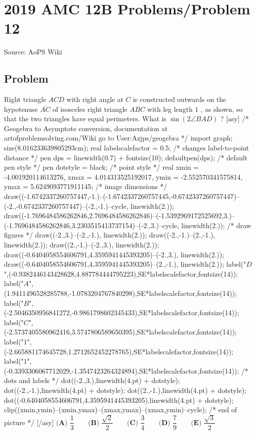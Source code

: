 \documentclass[12pt]{article}
\begin{document}
\section*{{2019 AMC 12B Problems/Problem 12}}
Source: AoPS Wiki

\subsection*{Problem}
Right triangle $ACD$ with right angle at $C$ is constructed outwards on the hypotenuse $\overline{AC}$ of isosceles right triangle $ABC$ with leg length $1$ , as shown, so that the two triangles have equal perimeters. What is $\sin(2\angle BAD)$ ? [asy] /* Geogebra to Asymptote conversion, documentation at artofproblemsolving.com/Wiki go to User:Azjps/geogebra */ import graph; size(8.016233639805293cm); real labelscalefactor = 0.5; /* changes label-to-point distance */ pen dps = linewidth(0.7) + fontsize(10); defaultpen(dps); /* default pen style */ pen dotstyle = black; /* point style */ real xmin = -4.001920114613276, xmax = 4.014313525192017, ymin = -2.552570341575814, ymax = 5.6249093771911145; /* image dimensions */ draw((-1.6742337260757447,-1.)--(-1.6742337260757445,-0.6742337260757447)--(-2.,-0.6742337260757447)--(-2.,-1.)--cycle, linewidth(2.)); draw((-1.7696484586262846,2.7696484586262846)--(-1.5392969172525692,3.)--(-1.7696484586262846,3.2303515413737154)--(-2.,3.)--cycle, linewidth(2.)); /* draw figures */ draw((-2.,3.)--(-2.,-1.), linewidth(2.)); draw((-2.,-1.)--(2.,-1.), linewidth(2.)); draw((2.,-1.)--(-2.,3.), linewidth(2.)); draw((-0.6404058554606791,4.3595941445393205)--(-2.,3.), linewidth(2.)); draw((-0.6404058554606791,4.3595941445393205)--(2.,-1.), linewidth(2.)); label("$D$",(-0.9382446143428628,4.887784444795223),SE*labelscalefactor,fontsize(14)); label("$A$",(1.9411496528285788,-1.0783204767840298),SE*labelscalefactor,fontsize(14)); label("$B$",(-2.5046350956841272,-0.9861798602345433),SE*labelscalefactor,fontsize(14)); label("$C$",(-2.5737405580962416,3.5747806589650395),SE*labelscalefactor,fontsize(14)); label("$1$",(-2.665881174645728,1.2712652452278765),SE*labelscalefactor,fontsize(14)); label("$1$",(-0.3393306067712029,-1.3547423264324894),SE*labelscalefactor,fontsize(14)); /* dots and labels */ dot((-2.,3.),linewidth(4.pt) + dotstyle); dot((-2.,-1.),linewidth(4.pt) + dotstyle); dot((2.,-1.),linewidth(4.pt) + dotstyle); dot((-0.6404058554606791,4.3595941445393205),linewidth(4.pt) + dotstyle); clip((xmin,ymin)--(xmin,ymax)--(xmax,ymax)--(xmax,ymin)--cycle); /* end of picture */ [/asy] $\textbf{(A) } \dfrac{1}{3} \qquad\textbf{(B) } \dfrac{\sqrt{2}}{2} \qquad\textbf{(C) } \dfrac{3}{4} \qquad\textbf{(D) } \dfrac{7}{9} \qquad\textbf{(E) } \dfrac{\sqrt{3}}{2}$
\end{document}
